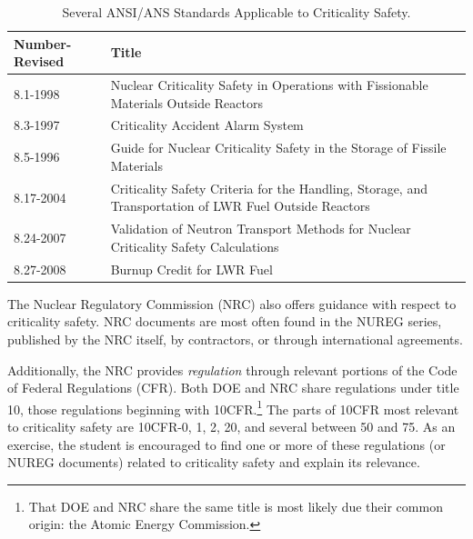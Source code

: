 \begin{table}[ht]
    \caption{Several ANSI/ANS Standards Applicable to Criticality Safety.}
    \begin{center} 
    \begin{tabular*}{1.00\textwidth}{@{\extracolsep{\fill}} p{3cm}p{} } 
      \toprule 
	Number-Revised    &  Title \\
      \midrule
       8.1-1998                  &  Nuclear Criticality Safety in Operations 
                                    with Fissionable Materials Outside 
                                    Reactors \\
       8.3-1997                  &  Criticality Accident Alarm System \\
       8.5-1996                  &  Guide for Nuclear Criticality Safety in 
                                    the Storage of Fissile Materials \\
       8.17-2004                 &  Criticality Safety Criteria for the 
                                    Handling, Storage, and Transportation 
                                    of LWR Fuel Outside Reactors \\
       8.24-2007                 &  Validation of Neutron Transport 
                                    Methods for Nuclear Criticality Safety 
                                    Calculations \\
       8.27-2008                 &  Burnup Credit for LWR Fuel \\
      \bottomrule 
    \end{tabular*} 
    \end{center} 
    \label{tbl:ansstandard}
\end{table}

The Nuclear Regulatory Commission (NRC) also offers guidance with 
respect to criticality safety.  NRC documents are most often found in 
the NUREG series, published by the NRC itself, by contractors, or through
international agreements.  

Additionally, the NRC provides \textit{regulation} through relevant 
portions of the Code of Federal Regulations (CFR).  Both DOE and NRC
share regulations under title 10, \ie those regulations beginning
with 10CFR.\footnote{That DOE and NRC share the same title is most likely
due their common origin: the Atomic Energy Commission.}
The parts of 10CFR most relevant to criticality safety are 10CFR-0, 1, 2,
20, and several between 50 and 75.  As an exercise, the student is
encouraged to find one or more of these regulations (or NUREG documents)
related to criticality safety and explain its relevance.

